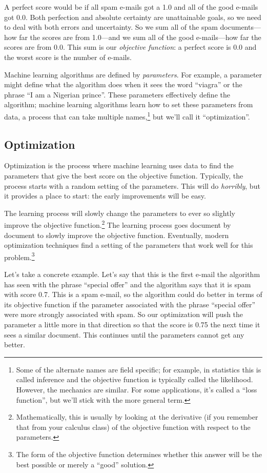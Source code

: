 A perfect score would be if all spam e-mails got a 1.0 and all of the
good e-mails got 0.0.  Both perfection and absolute certainty are
unattainable goals, so we need to deal with both errors and
uncertainty.  So we sum all of the spam documents---how far the
scores are from 1.0---and we sum all of the good e-mails---how
far the scores are from 0.0.  This sum is our \emph{objective
  function}: a perfect score is 0.0 and the worst score is the number
of e-mails.

Machine learning algorithms are defined by \emph{parameters}.  For
example, a parameter might define what the algorithm does when it sees
the word ``viagra'' or the phrase ``I am a Nigerian prince''.  These
parameters effectively define the algorithm; machine learning
algorithms learn how to set these parameters from data, a process that
can take multiple names,\footnote{Some of the alternate names are
  field specific; for example, in statistics this is called inference
  and the objective function is typically called the likelihood.
  However, the mechanics are similar.  For some applications, it's
  called a ``loss function'', but we'll stick with the more general
  term.} but we'll call it ``optimization''.

\subsection{Optimization}

Optimization is the process where machine learning uses data to find
the parameters that give the best score on the objective function.
Typically, the process starts with a random setting of the parameters.
This will do \emph{horribly}, but it provides a place to start: the
early improvements will be easy.

The learning process will slowly change the parameters to ever so
slightly improve the objective function.\footnote{Mathematically, this
  is usually by looking at the derivative (if you remember that from your calculus class) of the objective function with
  respect to the parameters.}  The learning process goes document by
document to slowly improve the objective function.  Eventually, modern
optimization techniques find a setting of the parameters that work
well for this problem.\footnote{The form of the objective function
  determines whether this answer will be the best possible or merely a
  ``good'' solution.}

Let's take a concrete example.  Let's say that this is the first
e-mail the algorithm has seen with the phrase ``special offer'' and the algorithm says that it
is spam with score 0.7.  This is a spam e-mail, so the algorithm could
do better in terms of its objective function if the parameter
associated with the phrase ``special offer'' were more strongly
associated with spam.  So our optimization will push the parameter a
little more in that direction so that the score is 0.75 the next time
it sees a similar document.  This continues until the parameters
cannot get any better.

